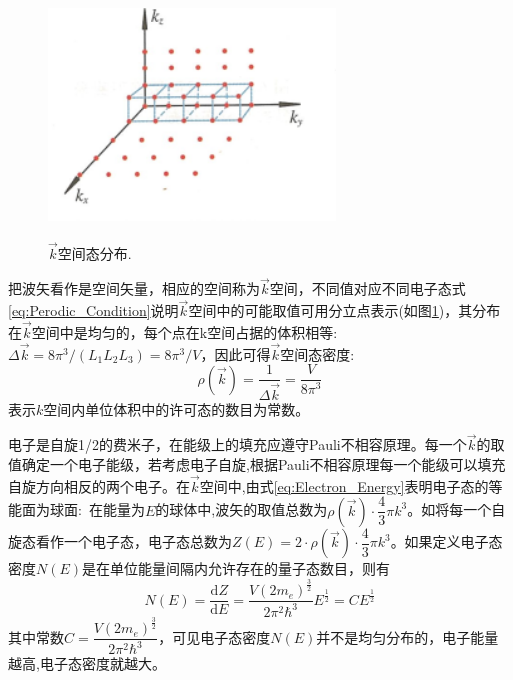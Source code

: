 \begin{figure}[h!]
\centering
\vspace*{-0.18in}
\includegraphics[height=2.55in,width=3.0in,viewport=0 0 55 45,clip]{Figures/K_space-discrete.png}
\caption{\small \textrm{$\vec k$空间态分布.}}%
\label{Fig:K_space}
\end{figure}
把波矢看作是空间矢量，相应的空间称为$\vec k$空间，不同值对应不同电子态式\eqref{eq:Perodic_Condition}说明$\vec k$空间中的可能取值可用分立点表示(如图\ref{Fig:K_space})，其分布在$\vec k$空间中是均匀的，每个点在k空间占据的体积相等: $\Delta\vec k=8\pi^3/(L_1L_2L_3)=8\pi^3/V$，因此可得$\vec k$空间态密度:
\begin{equation}
	\rho(\vec k)=\dfrac1{\Delta\vec k}=\dfrac{V}{8\pi^3}
	\label{eq:k-density}
\end{equation}
表示$k$空间内单位体积中的许可态的数目为常数。

电子是自旋1/2的费米子，在能级上的填充应遵守Pauli不相容原理。每一个$\vec k$的取值确定一个电子能级，若考虑电子自旋,根据Pauli不相容原理每一个能级可以填充自旋方向相反的两个电子。在$\vec k$空间中,由式\eqref{eq:Electron_Energy}表明电子态的等能面为球面:~在能量为$E$的球体中,波矢的取值总数为$\rho(\vec k)\cdot\dfrac43\pi k^3$。如将每一个自旋态看作一个电子态，电子态总数为$Z(E)=2\cdot \rho(\vec k)\cdot\dfrac43\pi k^3$。如果定义电子态密度$N(E)$是在单位能量间隔内允许存在的量子态数目，则有
\begin{equation}
	N(E)=\dfrac{\mathrm{d}Z}{\mathrm{d}E}=\dfrac{V(2m_e)^{\frac{3}{2}}}{2\pi^2\hbar^3}E^{\frac{1}{2}}=CE^{\frac{1}{2}}
	\label{eq:DOS}
\end{equation}
其中常数$C=\dfrac{V(2m_e)^{\frac{3}{2}}}{2\pi^2\hbar^3}$，可见电子态密度$N(E)$并不是均匀分布的，电子能量越高,电子态密度就越大。

